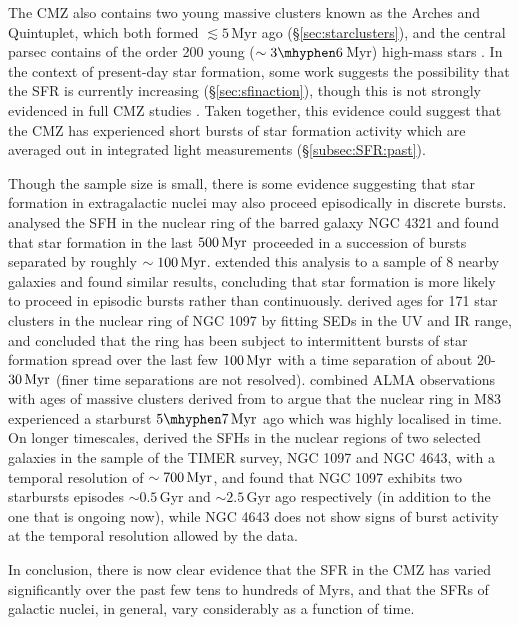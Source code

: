 The CMZ also contains two young massive clusters known as the Arches and Quintuplet, which both formed $\lesssim5$\,Myr ago (\S\ref{sec:starclusters}), and the central parsec contains of the order 200 young ($\sim3\mhyphen6$\,Myr) high-mass stars \citep{Genzel2010, Lu2013}. In the context of present-day star formation, some work \citep[e.g.][]{Lu2019b} suggests the possibility that the SFR is currently increasing (\S\ref{sec:sfinaction}), though this is not strongly evidenced in full CMZ studies \citep{Hatchfield2020, Battersby2020}. Taken together, this evidence could suggest that the CMZ has experienced short bursts of star formation activity which are averaged out in integrated light measurements (\S\ref{subsec:SFR:past}).

Though the sample size is small, there is some evidence suggesting that star formation in extragalactic nuclei may also proceed episodically in discrete bursts. \cite{Allard2006} analysed the SFH in the nuclear ring of the barred galaxy NGC 4321 and found that star formation in the last $500\, \mbox{${\rm Myr}$}$ proceeded in a succession of bursts separated by roughly $\sim 100\, \mbox{${\rm Myr}$}$. \cite{Sarzi2007} extended this analysis to a sample of 8 nearby galaxies and found similar results, concluding that star formation is more likely to proceed in episodic bursts rather than continuously. \cite{Prieto2019} derived ages for 171 star clusters in the nuclear ring of NGC 1097 
by fitting SEDs in the UV and IR range, and concluded that the ring has been subject to intermittent bursts of star formation spread over the last few $100\, \mbox{${\rm Myr}$}$ with a time separation of about $20$-$30\,\mbox{${\rm Myr}$}$ (finer time separations are not resolved). \cite{Callanan2021} combined ALMA observations with ages of massive clusters derived from \citet{Harris2001} to argue that the nuclear ring in M83 experienced a starburst $5\mhyphen7\, \myr$ ago which was highly localised in time. On longer timescales, \cite{Gadotti2019} derived the SFHs in the nuclear regions of two selected galaxies in the sample of the TIMER survey, NGC 1097 and NGC 4643, with a temporal resolution of $\sim 700 \, \mbox{${\rm Myr}$}$, and found that NGC 1097 exhibits two starbursts episodes $\sim 0.5$\,Gyr and $\sim 2.5$\,Gyr ago respectively (in addition to the one that is ongoing now), while NGC 4643 does not show signs of burst activity at the temporal resolution allowed by the data. 

In conclusion, there is now clear evidence that the SFR in the CMZ has varied significantly over the past few tens to hundreds of Myrs, and that the SFRs of galactic nuclei, in general, vary considerably as a function of time.

